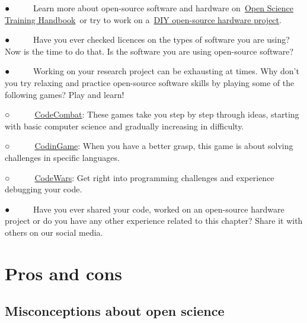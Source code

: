 \documentclass[
]{book}
\begin{document}
● ~ ~ ~ Learn more about open-source software and hardware on~\href{https://open-science-training-handbook.gitbook.io/book/open-science-basics/open-research-software-and-open-source}{}\href{https://open-science-training-handbook.gitbook.io/book/open-science-basics/open-research-software-and-open-source}{Open Science Training Handbook}~or try to work on a~\href{https://en.wikipedia.org/wiki/List_of_open-source_hardware_projects}{}\href{https://en.wikipedia.org/wiki/List_of_open-source_hardware_projects}{DIY open-source hardware project}.

● ~ ~ ~ Have you ever checked licences on the types of software you are using? Now is the time to do that. Is the software you are using open-source software?

● ~ ~ ~ Working on your research project can be exhausting at times. Why don't you try relaxing and practice open-source software skills by playing some of the following games? Play and learn!

○ ~ ~ ~~\href{https://codecombat.com/}{}\href{https://codecombat.com/}{CodeCombat}: These games take you step by step through ideas, starting with basic computer science and gradually increasing in difficulty.

○ ~ ~ ~~\href{https://www.codingame.com/start}{}\href{https://www.codingame.com/start}{CodinGame}: When you have a better grasp, this game is about solving challenges in specific languages.

○ ~ ~ ~~\href{https://www.codewars.com/}{}\href{https://www.codewars.com/}{CodeWars}: Get right into programming challenges and experience debugging your code.

● ~ ~ ~ Have you ever shared your code, worked on an open-source hardware project or do you have any other experience related to this chapter? Share it with others on our social media.

\hypertarget{pros-and-cons}{%
\chapter{\texorpdfstring{\textbf{Pros and cons}}{Pros and cons}}\label{pros-and-cons}}

\hypertarget{misconceptions-about-open-science}{%
\section{\texorpdfstring{\textbf{Misconceptions about open science}}{Misconceptions about open science}}\label{misconceptions-about-open-science}}
\end{document}
